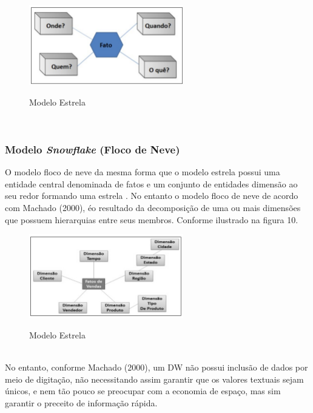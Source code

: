 \begin{figure}[H]
	\vspace*{0,2cm}
    \centering
    \caption{Modelo Estrela}
    \includegraphics[width=0.6\textwidth]{./04-figuras/figura-09}
    \label{fig:ilustfig09}
\end{figure}
\vspace*{-0,9cm}
{\raggedright {}} \\

\subsubsection{Modelo \textit{Snowflake} (Floco de Neve)}

O modelo floco de neve da mesma forma que o modelo estrela possui uma entidade central denominada de fatos e um conjunto de entidades dimens\~{a}o ao seu redor formando uma estrela
.
No entanto o modelo floco de neve de acordo com Machado (2000), \'{e}o resultado da decomposi\c{c}\~{a}o de uma ou mais dimens\~{o}es que possuem hierarquias entre seus membros. Conforme ilustrado na figura 10.
	
\begin{figure}[H]
	\vspace*{0,2cm}
    \centering
    \caption{Modelo Estrela}
    \includegraphics[width=0.6\textwidth]{./04-figuras/figura-10}
    \label{fig:ilustfig10}
\end{figure}
\vspace*{-0,9cm}
{\raggedright {}} \\

No entanto, conforme Machado (2000), um DW n\~{a}o possui inclus\~{a}o de dados por meio de digita\c{c}\~{a}o, n\~{a}o necessitando assim garantir que os valores textuais sejam únicos, e nem t\~{a}o pouco se preocupar com a economia de espa\c{c}o, mas sim garantir o preceito de informa\c{c}\~{a}o r\'{a}pida.

